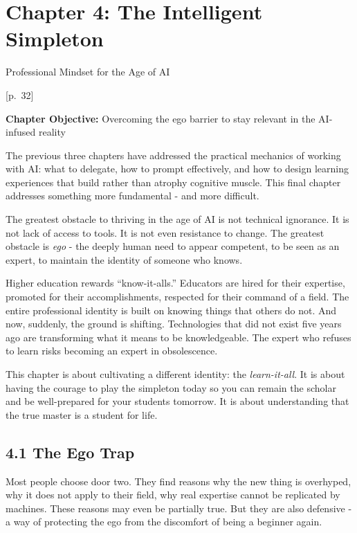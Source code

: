 \documentclass[
  letterpaper,
  DIV=11,
  numbers=noendperiod]{scrreprt}
\begin{document}

\chapter{Chapter 4: The Intelligent
Simpleton}\label{chapter-4-the-intelligent-simpleton}

Professional Mindset for the Age of AI

\hfill\break

{[}p.~32{]}

\textbf{Chapter Objective:} Overcoming the ego barrier to stay relevant
in the AI-infused reality

The previous three chapters have addressed the practical mechanics of
working with AI: what to delegate, how to prompt effectively, and how to
design learning experiences that build rather than atrophy cognitive
muscle. This final chapter addresses something more fundamental - and
more difficult.

The greatest obstacle to thriving in the age of AI is not technical
ignorance. It is not lack of access to tools. It is not even resistance
to change. The greatest obstacle is \emph{ego} - the deeply human need
to appear competent, to be seen as an expert, to maintain the identity
of someone who knows.

Higher education rewards ``know-it-alls.'' Educators are hired for their
expertise, promoted for their accomplishments, respected for their
command of a field. The entire professional identity is built on knowing
things that others do not. And now, suddenly, the ground is shifting.
Technologies that did not exist five years ago are transforming what it
means to be knowledgeable. The expert who refuses to learn risks
becoming an expert in obsolescence.

This chapter is about cultivating a different identity: the
\emph{learn-it-all}. It is about having the courage to play the
simpleton today so you can remain the scholar and be well-prepared for
your students tomorrow. It is about understanding that the true master
is a student for life.

\section{4.1 The Ego Trap}\label{the-ego-trap}

Most people choose door two. They find reasons why the new thing is
overhyped, why it does not apply to their field, why real expertise
cannot be replicated by machines. These reasons may even be partially
true. But they are also defensive - a way of protecting the ego from the
discomfort of being a beginner again.
\end{document}
